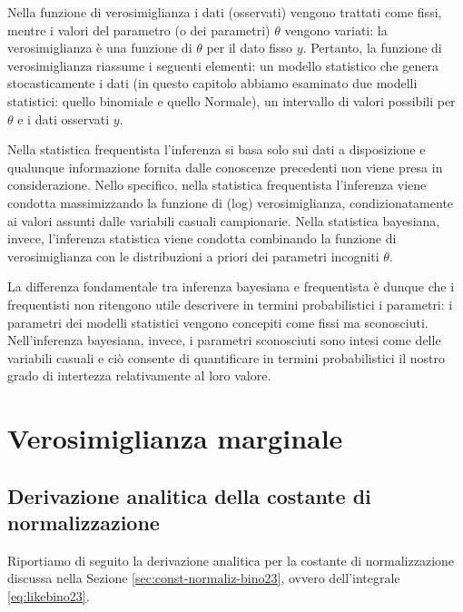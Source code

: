 \documentclass[
  11pt,
]{krantz}
\theoremstyle{definition}
\theoremstyle{definition}
\theoremstyle{definition}
\theoremstyle{definition}
\theoremstyle{remark}
\begin{document}
Nella funzione di verosimiglianza i dati (osservati) vengono trattati come fissi, mentre i valori del parametro (o dei parametri) \(\theta\) vengono variati: la verosimiglianza è una funzione di \(\theta\) per il dato fisso \(y\). Pertanto, la funzione di verosimiglianza riassume i seguenti elementi: un modello statistico che genera stocasticamente i dati (in questo capitolo abbiamo esaminato due modelli statistici: quello binomiale e quello Normale), un intervallo di valori possibili per \(\theta\) e i dati osservati \(y\).

Nella statistica frequentista l'inferenza si basa solo sui dati a disposizione e qualunque informazione fornita dalle conoscenze precedenti non viene presa in considerazione. Nello specifico, nella statistica frequentista l'inferenza viene condotta massimizzando la funzione di (log) verosimiglianza, condizionatamente ai valori assunti dalle variabili casuali campionarie. Nella statistica bayesiana, invece, l'inferenza statistica viene condotta combinando la funzione di verosimiglianza con le distribuzioni a priori dei parametri incogniti \(\theta\).

La differenza fondamentale tra inferenza bayesiana e frequentista è dunque che i frequentisti non ritengono utile descrivere in termini probabilistici i parametri: i parametri dei modelli statistici vengono concepiti come fissi ma sconosciuti. Nell'inferenza bayesiana, invece, i parametri sconosciuti sono intesi come delle variabili casuali e ciò consente di quantificare in termini probabilistici il nostro grado di intertezza relativamente al loro valore.

\hypertarget{appendix:const-norm-bino23}{%
\chapter{Verosimiglianza marginale}\label{appendix:const-norm-bino23}}

\hypertarget{derivazione-analitica-della-costante-di-normalizzazione}{%
\section{Derivazione analitica della costante di normalizzazione}\label{derivazione-analitica-della-costante-di-normalizzazione}}

Riportiamo di seguito la derivazione analitica per la costante di normalizzazione discussa nella Sezione \ref{sec:const-normaliz-bino23}, ovvero dell'integrale \eqref{eq:likebino23}.
\end{document}
